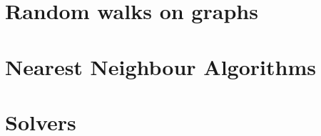 \section{Random walks on graphs}
\label{sec:randomWalks}


\section{Nearest Neighbour Algorithms}
\label{sec:nearestNeighbourAlgorithms}


\section{Solvers}
\label{sec:solvers}

